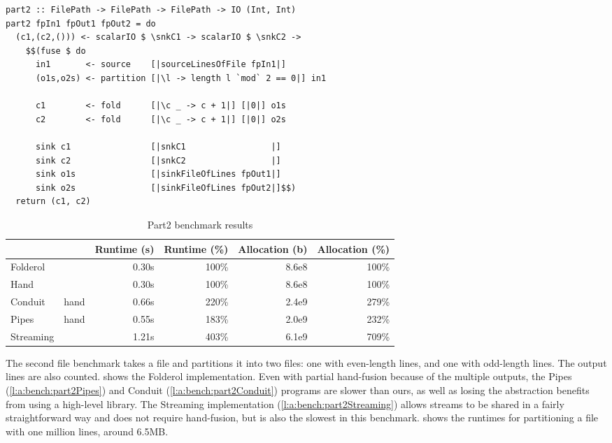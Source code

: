\begin{lstlisting}[float,label=l:bench:part2Folderol,caption=Folderol implementation of \Hs/part2/]
part2 :: FilePath -> FilePath -> FilePath -> IO (Int, Int)
part2 fpIn1 fpOut1 fpOut2 = do
  (c1,(c2,())) <- scalarIO $ \snkC1 -> scalarIO $ \snkC2 ->
    $$(fuse $ do
      in1       <- source    [|sourceLinesOfFile fpIn1|]
      (o1s,o2s) <- partition [|\l -> length l `mod` 2 == 0|] in1

      c1        <- fold      [|\c _ -> c + 1|] [|0|] o1s
      c2        <- fold      [|\c _ -> c + 1|] [|0|] o2s

      sink c1                [|snkC1                 |]
      sink c2                [|snkC2                 |]
      sink o1s               [|sinkFileOfLines fpOut1|]
      sink o2s               [|sinkFileOfLines fpOut2|]$$)
  return (c1, c2)
\end{lstlisting}
\begin{table}
\begin{center}
\begin{tabular}{ll|rrrr}
& & Runtime (s)  & Runtime (\%) & Allocation (b) & Allocation (\%) \\
\hline
Folderol &          & 0.30s &   100\% & 8.6e8 & 100\% \\
Hand     &          & 0.30s &   100\% & 8.6e8 & 100\% \\
Conduit & hand      & 0.66s &   220\% & 2.4e9 & 279\% \\
Pipes  & hand       & 0.55s &   183\% & 2.0e9 & 232\% \\
Streaming &         & 1.21s &   403\% & 6.1e9 & 709\% \\
\end{tabular}
\end{center}
\caption[Part2 benchmark results]{Part2 benchmark results}
\label{table:bench:part2}
\end{table}

The second file benchmark takes a file and partitions it into two files: one with even-length lines, and one with odd-length lines.
The output lines are also counted.
 shows the Folderol implementation.
Even with partial hand-fusion because of the multiple outputs, the Pipes (\cref{l:a:bench:part2Pipes}) and Conduit (\cref{l:a:bench:part2Conduit}) programs are slower than ours, as well as losing the abstraction benefits from using a high-level library.
The Streaming implementation (\cref{l:a:bench:part2Streaming}) allows streams to be shared in a fairly straightforward way and does not require hand-fusion, but is also the slowest in this benchmark.
 shows the runtimes for partitioning a file with one million lines, around 6.5MB.

